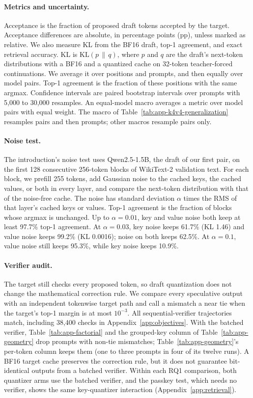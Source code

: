 \documentclass{article}
\begin{document}
\paragraph{Metrics and uncertainty.}
Acceptance is the fraction of proposed draft tokens accepted by the target.
Acceptance differences are absolute, in percentage points (pp), unless marked as relative.
We also measure KL from the BF16 draft, top-1 agreement, and exact retrieval
accuracy. KL is $\mathrm{KL}(p\,\|\,q)$, where $p$ and $q$ are the draft's
next-token distributions with a BF16 and a quantized cache on 32-token
teacher-forced continuations. We average it over positions and prompts, and then
equally over model pairs. Top-1 agreement is the fraction of these positions with
the same argmax.
Confidence intervals are paired bootstrap intervals over prompts with 5,000 to
30,000 resamples. An equal-model macro averages a metric over model pairs with
equal weight. The macro of Table~\ref{tab:app-k4v4-generalization} resamples
pairs and then prompts; other macros resample pairs only.

\paragraph{Noise test.}
The introduction's noise test uses Qwen2.5-1.5B, the draft of our first pair, on
the first 128 consecutive 256-token blocks of WikiText-2 validation text. For
each block, we prefill 255 tokens, add Gaussian noise to the cached keys, the
cached values, or both in every layer, and compare the next-token distribution
with that of the noise-free cache. The noise has standard deviation $\alpha$
times the RMS of that layer's cached keys or values. Top-1 agreement is the
fraction of blocks whose argmax is unchanged. Up to $\alpha=0.01$, key and value
noise both keep at least 97.7\% top-1 agreement. At $\alpha=0.03$, key noise
keeps 61.7\% (KL 1.46) and value noise keeps 99.2\% (KL 0.0016); noise on both
keeps 62.5\%. At $\alpha=0.1$, value noise still keeps 95.3\%, while key noise
keeps 10.9\%.

\paragraph{Verifier audit.}
The target still checks every proposed token, so draft quantization does not
change the mathematical correction rule. We compare every speculative output
with an independent tokenwise target path and call a mismatch a near tie when
the target's top-1 margin is at most $10^{-3}$. All sequential-verifier
trajectories match, including 38,400 checks in Appendix~\ref{app:objectives}.
With the batched verifier, Table~\ref{tab:app-factorial} and the grouped-key
column of Table~\ref{tab:app-geometry} drop prompts with non-tie mismatches;
Table~\ref{tab:app-geometry}'s per-token column keeps them (one to three prompts
in four of its twelve runs). A BF16 target
cache preserves the correction rule, but it does not guarantee bit-identical
outputs from a batched verifier. Within each RQ1 comparison, both quantizer arms
use the batched verifier, and the passkey test, which needs no verifier, shows
the same key-quantizer interaction (Appendix~\ref{app:retrieval}).
\end{document}
